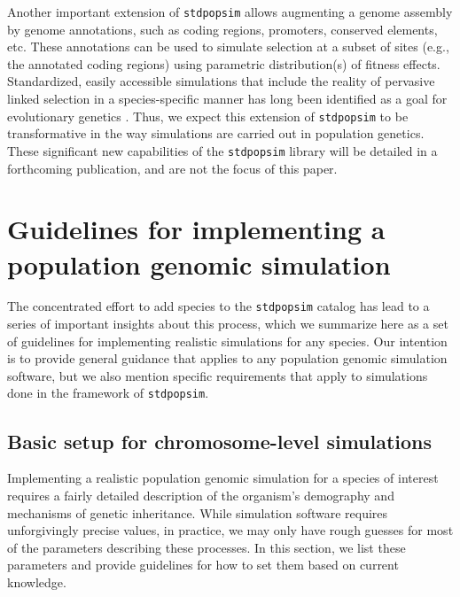 \documentclass[hidelinks]{article}
\makeatletter
\newcommand{\stdpopsim}{\texttt{stdpopsim}\xspace}
\newcommand{\labelname}[1]{\def\@currentlabelname{#1}}
\makeatother
\begin{document}
Another important extension of \stdpopsim allows augmenting a genome assembly by genome annotations, such as coding regions, promoters, conserved elements, etc.
These annotations can be used to simulate selection at a subset of sites (e.g., the annotated coding regions)
using parametric distribution(s) of fitness effects.
Standardized, easily accessible simulations
that include the reality of pervasive linked selection in a species-specific
manner has long been identified as a goal for evolutionary genetics
\cite[e.g.,][]{McVicker2009,comeron2014background}.
Thus, we expect this extension of \stdpopsim to be transformative in the way simulations are carried out in population genetics.
These significant new capabilities of the \stdpopsim library will be detailed in a forthcoming publication,
and are not the focus of this paper.

\section*{Guidelines for implementing a population genomic simulation}
    \labelname{Guidelines}
    \label{sec:sim-guidelines}


The concentrated effort to add species to the \stdpopsim catalog
has lead to a series of important insights about this process,
which we summarize here as a set of guidelines
for implementing realistic simulations for any species.
Our intention is to provide general guidance that applies to any population genomic simulation software,
but we also mention specific requirements that apply to simulations done in the framework of \stdpopsim.

\subsection*{Basic setup for chromosome-level simulations}

Implementing a realistic population genomic simulation for a species of interest
requires a fairly detailed description of the organism's demography and mechanisms of genetic inheritance.
While simulation software requires unforgivingly precise values,
in practice, we may only have rough guesses for most of  the parameters describing these processes.
In this section, we list these parameters and
provide guidelines for how to set them based on current knowledge.
\end{document}
